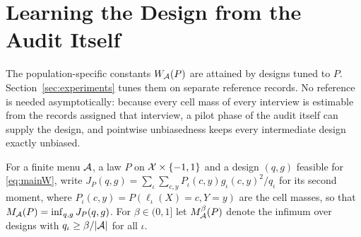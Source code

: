 \section{Learning the Design from the Audit Itself}\label{app:selfcal}
The population-specific constants $W_\mathcal A(P)$ are attained by designs tuned to
$P$. Section~\ref{sec:experiments} tunes them on separate reference records.
No reference is needed asymptotically: because every cell mass of every
interview is estimable from the records assigned that interview, a pilot
phase of the audit itself can supply the design, and pointwise unbiasedness
keeps every intermediate design exactly unbiased.

For a finite menu $\mathcal A$, a law $P$ on $\mathcal X\times\{-1,1\}$ and a design $(q,g)$
feasible for \eqref{eq:mainW}, write $J_P(q,g)=\sum_\iota\sum_{c,y}P_\iota(c,y)g_\iota(c,y)^2/q_\iota$
for its second moment, where $P_\iota(c,y)=P(\ell_\iota(X)=c,Y=y)$ are the
cell masses, so that $M_\mathcal A(P)=\inf_{q,g}J_P(q,g)$. For $\beta\in(0,1]$ let
$M_\mathcal A^{\beta}(P)$ denote the infimum over designs with $q_\iota\ge\beta/|\mathcal A|$
for all $\iota$.

